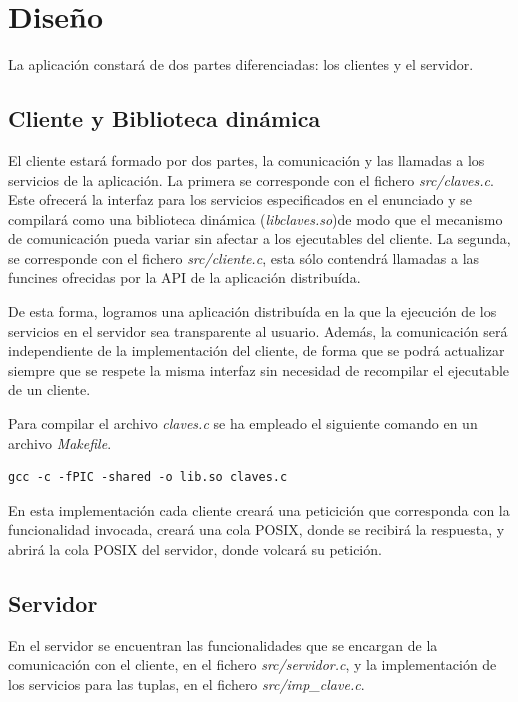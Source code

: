 \documentclass[]{article}
\begin{document}
\section{Diseño}
\label{sec:disenno}
La aplicación constará de dos partes diferenciadas: los clientes y el servidor.

\subsection{Cliente y Biblioteca dinámica}
\label{subsec:cliente_biblioteca}
El cliente estará formado por dos partes, la comunicación y las llamadas a los servicios de la aplicación. La primera se corresponde con el fichero \textit{src/claves.c}. Este ofrecerá la interfaz para los servicios especificados en el enunciado y se compilará como una biblioteca dinámica (\textit{libclaves.so})de modo que el mecanismo de comunicación pueda variar sin afectar a los ejecutables del cliente. La segunda, se corresponde con el fichero \textit{src/cliente.c}, esta sólo contendrá llamadas a las funcines ofrecidas por la API de la aplicación distribuída.  

De esta forma, logramos una aplicación distribuída en la que la ejecución de los servicios en el servidor sea transparente al usuario. Además, la comunicación será independiente de la implementación del cliente, de forma que se podrá actualizar siempre que se respete la misma interfaz sin necesidad de recompilar el ejecutable de un cliente.

Para compilar el archivo \textit{claves.c} se ha empleado el siguiente comando en un archivo \textit{Makefile}.

\begin{center}
\begin{lstlisting}[caption=Compiación de biblioteca dinámica]
gcc -c -fPIC -shared -o lib.so claves.c
\end{lstlisting}
\end{center}

En esta implementación cada cliente creará una peticición que corresponda con la funcionalidad invocada, creará una cola POSIX, donde se recibirá la respuesta, y abrirá la cola POSIX del servidor, donde volcará su petición.

\subsection{Servidor}
\label{subsec:servidor}
En el servidor se encuentran las funcionalidades que se encargan de la comunicación con el cliente, en el fichero \textit{src/servidor.c}, y la implementación de los servicios para las tuplas, en el fichero \textit{src/imp\_clave.c}.
\end{document}
